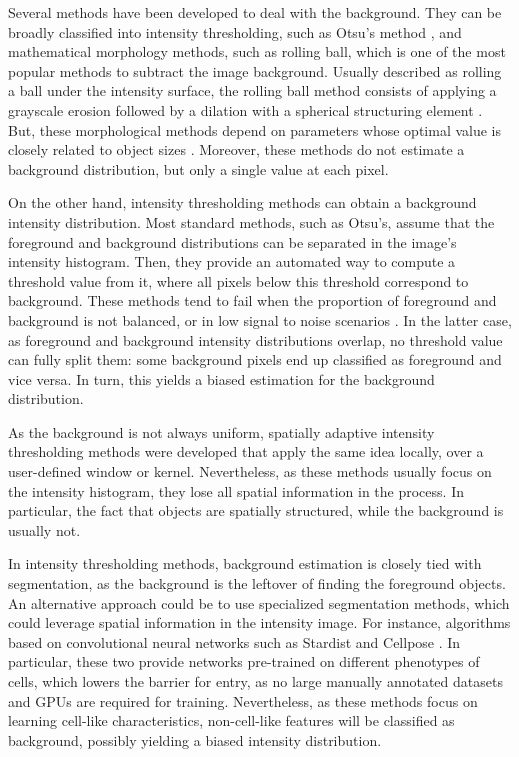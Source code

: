 \documentclass[article]{jss}
\begin{document}
	Several methods have been developed to deal with the background. They can be broadly classified into intensity thresholding, such as Otsu’s method \citep{Otsu1979}, and mathematical morphology methods, such as rolling ball, which is one of the most popular methods to subtract the image background. Usually described as rolling a ball under the intensity surface, the rolling ball method consists of applying a grayscale erosion followed by a dilation with a spherical structuring element \citep{Sternberg1983}. But, these morphological methods depend on parameters whose optimal value is closely related to object sizes \citep{Kervrann2016}. Moreover, these methods do not estimate a background distribution, but only a single value at each pixel.
	
	On the other hand, intensity thresholding methods can obtain a background intensity distribution. Most standard methods, such as Otsu’s, assume that the foreground and background distributions can be separated in the image’s intensity histogram. Then, they provide an automated way to compute a threshold value from it, where all pixels below this threshold correspond to background. These methods tend to fail when the proportion of foreground and background is not balanced, or in low signal to noise scenarios \citep{Sezgin2004}. In the latter case, as foreground and background intensity distributions overlap, no threshold value can fully split them: some background pixels end up classified as foreground and vice versa. In turn, this yields a biased estimation for the background distribution.
	
	As the background is not always uniform, spatially adaptive intensity thresholding methods were developed that apply the same idea locally, over a user-defined window or kernel. Nevertheless, as these methods usually focus on the intensity histogram, they lose all spatial information in the process. In particular, the fact that objects are spatially structured, while the background is usually not.
	
	In intensity thresholding methods, background estimation is closely tied with segmentation, as the background is the leftover of finding the foreground objects. An alternative approach could be to use specialized segmentation methods, which could leverage spatial information in the intensity image. For instance, algorithms based on convolutional neural networks such as Stardist \citep{Schmidt2018} and Cellpose \citep{Stringer2021}. In particular, these two provide networks pre-trained on different phenotypes of cells, which lowers the barrier for entry, as no large manually annotated datasets and GPUs are required for training. Nevertheless, as these methods focus on learning cell-like characteristics, non-cell-like features will be classified as background, possibly yielding a biased intensity distribution.
	
\end{document}
